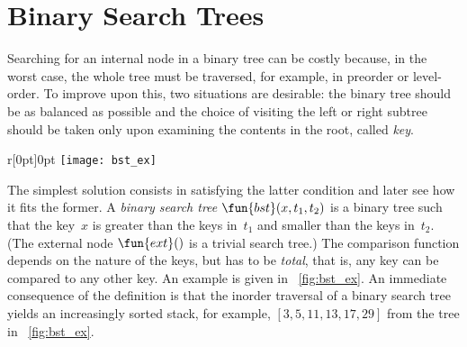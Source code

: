 \chapter{Binary Search Trees}

Searching for an internal node in a binary tree can be costly because,
in the worst case, the whole tree must be traversed, for example, in
preorder or level\hyp{}order. To improve upon this, two situations are
desirable: the binary tree should be as balanced as possible and the choice of visiting the
left or right subtree should be taken only upon examining the contents
in the root, called \emph{key}.

\begin{wrapfigure}[7]{r}[0pt]{0pt}
\centering
\texttt{[image: bst\_ex]} %
\caption{}
\label{fig:bst_ex}
\end{wrapfigure}
The simplest solution consists in satisfying the latter condition and
later see how it fits the former. A \emph{binary search tree}
\citep{Mahmoud_1992} \(\fun{bst}(x, t_1,
t_2)\) is a binary tree such that the key~\(x\)
is greater than the keys in~\(t_1\) and smaller than the keys
in~\(t_2\). (The external node \(\fun{ext}()\) is a trivial search
tree.) The comparison function depends on the nature of the keys, but
has to be \emph{total}, that is, any key can be compared to any other
key. An example is given in \fig~\vref{fig:bst_ex}. An immediate
consequence of the definition is that the inorder traversal of a binary search tree yields an
increasingly sorted stack, for example, \([3,5,11,13,17,29]\) from the
tree in \fig~\ref{fig:bst_ex}.

